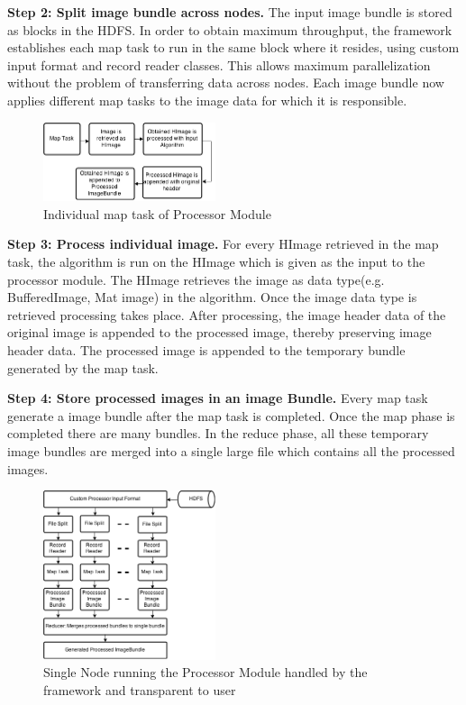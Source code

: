 \documentclass[conference]{IEEEtran}
\begin{document}
\textbf{Step 2: Split image bundle across nodes.} The input image
bundle is stored as blocks in the HDFS.  In order to obtain maximum
throughput, the framework establishes each map task to run in the same
block where it resides, using custom input format and record reader
classes. This allows maximum parallelization without the problem of
transferring data across nodes.  Each image bundle now applies
different map tasks to the image data for which it is responsible.

\begin{figure}[h]
	\centering
	\includegraphics[width=0.45\textwidth]{pro-map}
	\caption{Individual map task of Processor Module}
	\label{fig:pro-map}
\end{figure}

\textbf{Step 3: Process individual image.} For every HImage retrieved in the map task, the algorithm is run on the HImage which is given as the input to the processor module. The HImage retrieves the image as data type(e.g. BufferedImage, Mat image) in the algorithm. Once the image data type is retrieved processing takes place. After processing, the image header data of the original image is appended to the processed image, thereby preserving image header data. The processed image is appended to the temporary bundle generated by the map task.

\textbf{Step 4: Store processed images in an image Bundle.} Every map task generate a image bundle after the map task is completed. Once the map phase is completed there are many bundles. In the reduce phase, all these temporary image bundles are merged into a single large file which contains all the processed images.

\begin{figure}[h]
	\centering
	\includegraphics[width=0.45\textwidth]{pro-node}
	\caption{Single Node running the Processor Module handled by the framework and transparent to user}
	\label{fig:pro-node}
\end{figure}
\end{document}
